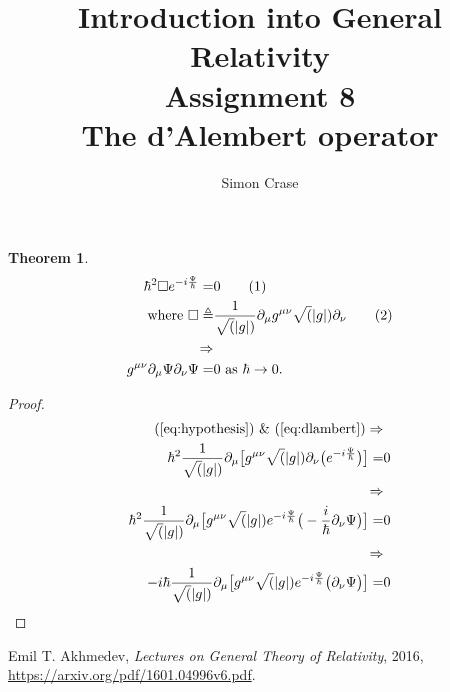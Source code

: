 \documentclass[]{article}
\title{Introduction into General Relativity\\Assignment 8\\The d'Alembert operator}
\author{Simon Crase}
\newtheorem{theorem}{Theorem}
\newcommand\numberthis{\addtocounter{equation}{1}\tag{\theequation}}
\begin{document}
\maketitle


\begin{theorem}
\begin{align*}
	\hbar^2 \Box e^{-i\frac{\Psi}{\hbar}}=&0 \numberthis \label{eq:hypothesis}\\ \text{ where } \Box \triangleq& \frac{1}{\sqrt(|g|)} \partial_{\mu} g^{\mu\nu}\sqrt(|g|)\partial_{\nu}\numberthis\label{eq:dlambert}\\ \Rightarrow&\\ g^{\mu\nu}\partial_{\mu}\Psi \partial_{\nu}\Psi=&0 \text{ as }\hbar \rightarrow 0.
\end{align*}
\end{theorem}

\begin{proof}
\begin{align*}
	\text{(\ref{eq:hypothesis}) \& (\ref{eq:dlambert})} \Rightarrow&\\
	\hbar^2 \frac{1}{\sqrt(|g|)} \partial_{\mu}\big[ g^{\mu\nu}\sqrt(|g|)\partial_{\nu}\big(e^{-i\frac{\Psi}{\hbar}}\big)\big]=&0\\
	\Rightarrow&\\
	\hbar^2 \frac{1}{\sqrt(|g|)} \partial_{\mu}\big[ g^{\mu\nu}\sqrt(|g|)e^{-i\frac{\Psi}{\hbar}}\big(-\frac{i}{\hbar}\partial_{\nu}\Psi\big)\big]=&0\\
	\Rightarrow&\\
	-i \hbar \frac{1}{\sqrt(|g|)} \partial_{\mu}\big[ g^{\mu\nu}\sqrt(|g|)e^{-i\frac{\Psi}{\hbar}}\big(\partial_{\nu}\Psi\big)\big]=&0
\end{align*}	

\end{proof}

\begin{thebibliography}{9}
	
	Emil T. Akhmedev,
	\emph{Lectures on General Theory of Relativity},
	2016,
	\url{https://arxiv.org/pdf/1601.04996v6.pdf}.
	

\end{thebibliography}
\end{document}
